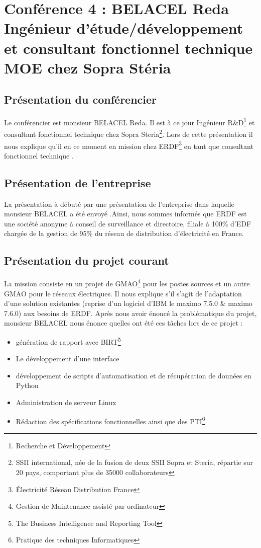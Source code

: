  \section{Conférence 4 : BELACEL Reda Ingénieur d'étude/développement et consultant fonctionnel technique MOE chez Sopra Stéria }
 
 	\subsection{Présentation du conférencier}
 Le conférencier est  monsieur BELACEL Reda. Il est à ce jour Ingénieur R\&D\footnote{Recherche et Développement} et consultant fonctionnel technique chez Sopra Steria\footnote{SSII international, née de la fusion de deux SSII Sopra et Steria, répartie sur 20 pays, comportant plus de 35000 collaborateurs}. Lors de cette présentation il nous explique qu'il en ce moment en mission chez ERDF\footnote{Électricité Réseau Distribution France} en tant que consultant fonctionnel technique .

 	\subsection{Présentation de l'entreprise}
 	La présentation à débuté par une présentation de l'entreprise dans laquelle monsieur BELACEL a été envoyé .Ainsi, nous sommes informés que ERDF est une société anonyme à conseil de surveillance et directoire, filiale à 100\% d'EDF chargée de la gestion de 95\% du réseau de distribution d'électricité en France.

 	\subsection{Présentation du projet courant}
 	La mission consiste en un projet de GMAO\footnote{Gestion de Maintenance assisté par ordinateur} pour les postes sources et un autre GMAO pour le réseaux électriques. Il nous explique s'il s'agit de l'adaptation d'une solution existantes (reprise d'un logiciel d'IBM le maximo 7.5.0 \& maximo 7.6.0) aux besoins de ERDF. Après nous avoir énoncé la problématique du projet, monsieur BELACEL nous énonce quelles ont été ces tâches lors de ce projet :
 	\begin{itemize}
 		\item génération de rapport avec BIRT\footnote{The Business Intelligence and Reporting Tool} 
 		\item Le développement d'une interface 
 		\item développement de scripts d'automatisation et de récupération de données en Python 
 		\item Administration de serveur Linux 
 		\item Rédaction des spécifications fonctionnelles ainsi que des PTI\footnote{Pratique des techniques Informatiques}    
 	\end{itemize} 	

